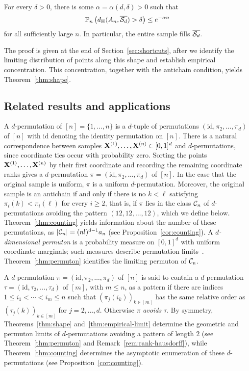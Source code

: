 \documentclass[11pt,letterpaper]{article}
\begin{document}
\begin{theorem}\label{thm:shape}
      For every $\delta>0$, there is some $\alpha=\alpha(d,\delta)>0$ such that
      \[
            \mathbb P_n\left(d_{\rm H}(A_n,\overline{\mathcal S_d})>\delta \right) \le e^{-\alpha n}
      \]
      for all sufficiently large $n$. In particular, the entire sample fills $\overline{\mathcal S_d}$.
\end{theorem}
The proof is given at the end of Section~\ref{sec:shortcuts}, after we identify the limiting distribution of points along this shape and establish empirical concentration. This concentration, together with the antichain condition, yields Theorem~\ref{thm:shape}.

\subsection{Related results and applications}\label{sec:background}
A $d$-permutation of $[n]=\{1,\ldots,n\}$ is a $d$-tuple of permutations $(\mathrm{id},\pi_{2},\ldots,\pi_{d})$ of $[n]$ with $\mathrm{id}$ denoting the identity permutation on $[n]$. There is a natural correspondence between samples $\mathbf X^{(1)},\ldots,\mathbf X^{(n)}\in[0,1]^{d}$ and $d$-permutations, since coordinate ties occur with probability zero. Sorting the points $\mathbf X^{(1)},\ldots,\mathbf X^{(n)}$ by their first coordinate and recording the remaining coordinate ranks gives a $d$-permutation $\pi=(\mathrm{id},\pi_2,\ldots,\pi_d)$ of $[n]$. In the case that the original sample is uniform, $\pi$ is a uniform $d$-permutation. Moreover, the original sample is an antichain if and only if there is no $k<\ell$ satisfying $\pi_i(k)<\pi_i(\ell)$ for every $i\ge2$, that is, if $\pi$ lies in the class $\mathcal C_n$ of $d$-permutations avoiding the pattern $(12,12,\ldots,12)$, which we define below. Theorem~\ref{thm:counting} yields information about the number of these permutations, as $|\mathcal C_n|=(n!)^{d-1}a_n$ (see Proposition~\ref{cor:counting}). A \emph{$d$-dimensional permuton} is a probability measure on $[0,1]^d$ with uniform coordinate marginals; such measures describe permutation limits~\cite{HKMRS,BL}. Theorem~\ref{thm:permuton} identifies the limiting permuton of $\mathcal C_n$.

A $d$-permutation $\pi=(\mathrm{id},\pi_{2},\ldots,\pi_{d})$ of $[n]$ is said to contain a $d$-permutation $\tau=(\mathrm{id},\tau_{2},\ldots,\tau_{d})$ of $[m]$, with $m\le n$, as a pattern if there are indices $1\le i_{1}<\cdots<i_{m}\le n$ such that $(\pi_{j}(i_k))_{k\in[m]}$ has the same relative order as $(\tau_{j}(k))_{k\in[m]}$ for $j=2,\ldots,d$. Otherwise $\pi$ {\em avoids} $\tau$.
By symmetry, Theorems~\ref{thm:shape} and~\ref{thm:empirical-limit} determine the geometric and permuton limits of $d$-permutations avoiding a pattern of length $2$ (see Theorem~\ref{thm:permuton} and Remark~\ref{rem:rank-hausdorff}), while Theorem~\ref{thm:counting} determines the asymptotic enumeration of these $d$-permutations (see Proposition~\ref{cor:counting}).
\end{document}
